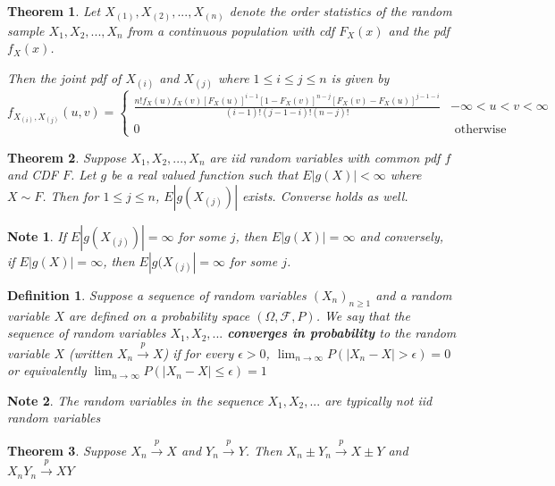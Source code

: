 \documentclass[14pt,twoside]{extreport}
\theoremstyle{dotless}
\newtheorem*{defn}{Definition}
\newtheorem*{thm}{Theorem} %
\newtheorem*{note}{Note} %
\begin{document}
\begin{thm}
    Let $X_{(1)}, X_{(2)}, ..., X_{(n)}$ denote the order statistics of the random sample $X_1, X_2, ..., X_n$ from a continuous population with cdf $F_X(x)$ and the pdf $f_X(x)$.

    Then the joint pdf of $X_{(i)}$ and $X_{(j)}$ where $1 \leq i \leq j \leq n$ is given by \\ 
    $ f_{X_{(i)}, X_{(j)}}(u,v) = \begin{cases} \displaystyle \frac{n! f_X(u) f_X(v) [F_X(u)]^{i-1} [1-F_X(v)]^{n-j} [F_X(v) - F_X(u)]^{j-1-i}}{(i-1)!(j-1-i)!(n-j)!} & -\infty < u < v < \infty \\ 0 & \text{ otherwise } \end{cases}$
\end{thm}

\begin{thm}
    Suppose $X_1, X_2, ..., X_n$ are iid random variables with common pdf $f$ and CDF $F$. Let $g$ be a real valued function such that $E|g(X)| < \infty$ where $X \sim F$. Then for $1 \leq j \leq n$, $E|g(X_{(j)})|$ exists. Converse holds as well.
\end{thm}

\begin{note}
    If $E|g(X_{(j)})| = \infty$ for some $j$, then $E|g(X)| = \infty$ and conversely, \\if $E|g(X)|=\infty$, then $E|g(X_{(j)}| = \infty$ for some $j$.
\end{note}

\begin{defn}
    Suppose a sequence of random variables $(X_n)_{n \geq 1}$ and a random variable $X$ are defined on a probability space $(\Omega, \mathcal{F}, P)$. We say that the sequence of random variables $X_1, X_2, ...$ \textbf{converges in probability} to the random variable $X$ (written $X_n \overset{p}{\to} X$) if for every $\epsilon > 0$, $ \lim_{n \to \infty} P(|X_n - X| > \epsilon) = 0$ or equivalently $\lim_{n \to \infty} P(|X_n - X| \leq \epsilon) = 1$
\end{defn}

\begin{note}
    The random variables in the sequence $X_1, X_2, ...$ are typically not iid random variables
\end{note}

\begin{thm}
    Suppose $X_n \overset{p}{\to} X$ and $Y_n \overset{p}{\to} Y$. Then $X_n \pm Y_n \overset{p}{\to} X \pm Y$  and $X_n Y_n \overset{p}{\to} XY$
\end{thm}
\end{document}
